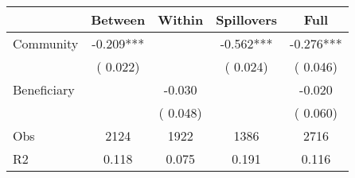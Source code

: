 
\begin{tabular}{l*{4}{c}}\hline&\multicolumn{1}{c}{Between}&\multicolumn{1}{c}{Within}&\multicolumn{1}{c}{Spillovers}&\multicolumn{1}{c}{Full}\\ \hline
 Community             &             -0.209***      &                                               &       -0.562*** &        -0.276***                            \\ 
                               &        (       0.022)           &                                       &       (       0.024)     &      (       0.046)                                           \\ 
 Beneficiary   &                                               &       -0.030    &                                &            -0.020                            \\ 
                               &                                               & (       0.048)                  &                                        &      (       0.060)                                           \\ 
\hline                                                                                                                                                                                                                                            
 Obs                   &               2124               &       1922                       &       1386                &              2716                                               \\ 
 R2                    &                      0.118              &              0.075                      &              0.191               &                     0.116                                              \\ 
\hline \end{tabular}                                                                                                                                                                                                              